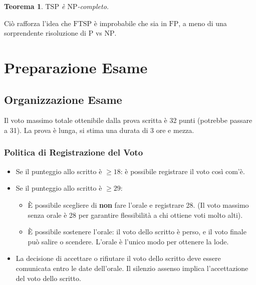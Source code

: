 \documentclass[a4paper, 11pt]{book} %
\newtheorem{theorem}{Teorema}[section]
\theoremstyle{definition}
\begin{document}
\begin{theorem}
$\text{TSP}$ è $\text{NP}$-completo.
\end{theorem}

Ciò rafforza l'idea che $\text{FTSP}$ è improbabile che sia in $\text{FP}$, a meno di una sorprendente risoluzione di $\text{P}$ vs $\text{NP}$.



\chapter{Preparazione Esame}



\section{Organizzazione Esame}
Il voto massimo totale ottenibile dalla prova scritta è 32 punti (potrebbe passare a 31).
La prova è lunga, si stima una durata di 3 ore e mezza.

\subsection{Politica di Registrazione del Voto}
\begin{itemize}
    \item Se il punteggio allo scritto è $\geq 18$: è possibile registrare il voto così com'è.
    \item Se il punteggio allo scritto è $\geq 29$:
    \begin{itemize}
        \item È possibile scegliere di \textbf{non} fare l'orale e registrare 28. (Il voto massimo senza orale è 28 per garantire flessibilità a chi ottiene voti molto alti).
        \item È possibile sostenere l'orale: il voto dello scritto è perso, e il voto finale può salire o scendere. L'orale è l'unico modo per ottenere la lode.
    \end{itemize}
    \item La decisione di accettare o rifiutare il voto dello scritto deve essere comunicata entro le date dell'orale. Il silenzio assenso implica l'accettazione del voto dello scritto.
\end{itemize}
\end{document}
